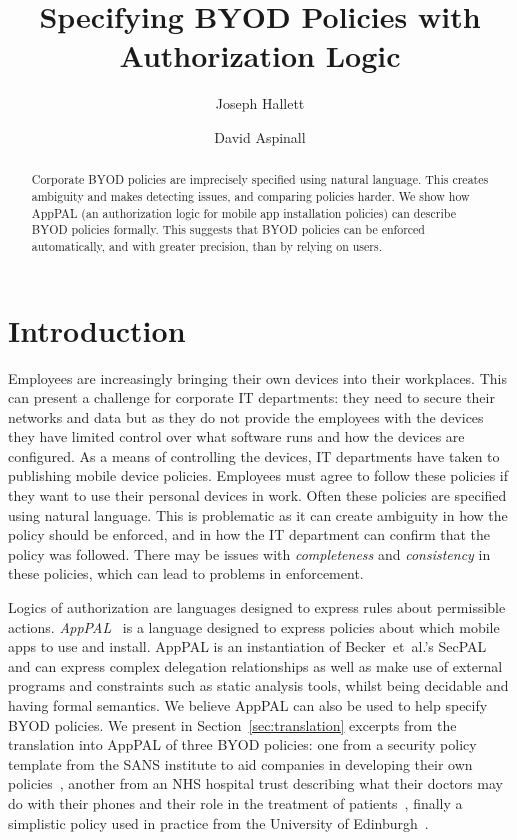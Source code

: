 \documentclass{easychair}
\title{Specifying BYOD Policies with Authorization Logic}
\author{
  Joseph Hallett\inst{1}
  \and
  David Aspinall\inst{1}
}
\institute{
  University of Edinburgh
}
\begin{document}
\maketitle

\begin{abstract}
  Corporate BYOD policies are imprecisely specified using natural language.
  This creates ambiguity and makes detecting issues, and comparing policies harder.
  We show how AppPAL (an authorization logic for mobile app installation policies) can describe BYOD policies formally.
  This suggests that BYOD policies can be enforced automatically, and with greater precision, than by relying on users.
\end{abstract}

\section{Introduction}

Employees are increasingly bringing their own devices into their workplaces.
This can present a challenge for corporate IT departments:
  they need to secure their networks and data but as they do not provide the employees with the devices they have limited control over what software runs and how the devices are configured.
As a means of controlling the devices, IT departments have taken to publishing mobile device policies.
Employees must agree to follow these policies if they want to use their personal devices in work.
Often these policies are specified using natural language.
This is problematic as it can create ambiguity in how the policy should be enforced, and in how the IT department can confirm that the policy was followed.
There may be issues with \emph{completeness} and \emph{consistency} in these policies, which can lead to problems in enforcement.

Logics of authorization are languages designed to express rules about permissible actions.
\emph{AppPAL}~\cite{Hallett:2016vu} is a language designed to express policies about which mobile apps to use and install.
AppPAL is an instantiation of Becker~et~al{.}'s SecPAL~\cite{Becker:2006vh} and can express complex delegation relationships as well as make use of external programs and constraints such as static analysis tools, whilst being decidable and having formal semantics.
We believe AppPAL can also be used to help specify BYOD policies. 
We present in Section~\ref{sec:translation} excerpts from the translation into AppPAL of three BYOD policies: one from a security policy template from the SANS institute to aid companies in developing their own policies~\cite{Guerin:2008we}, another from an NHS hospital trust describing what their doctors may do with their phones and their role in the treatment of patients~\cite{Kennington:2014tr}, finally a simplistic policy used in practice from the University of Edinburgh~\cite{Williamson:2015tr}.
\end{document}

